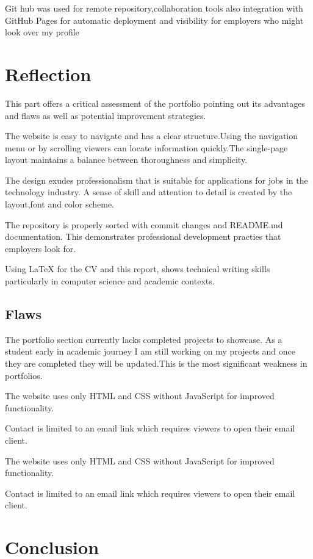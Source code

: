 \documentclass[12pt,a4paper]{article}
\begin{document}
Git hub was used for remote repository,collaboration tools also integration with GitHub Pages for automatic deployment and visibility for employers who might look over my profile 
\section{Reflection}

This part offers a critical assessment of the portfolio pointing out its advantages and flaws as well as potential improvement strategies.

The website is easy to navigate and has a clear structure.Using the navigation menu or by scrolling viewers can locate information quickly.The single-page layout maintains a balance between thoroughness and simplicity.

The design exudes professionalism that is suitable for applications for jobs in the technology industry. A sense of skill and attention to detail is created by the layout,font and color scheme.

The repository is properly sorted with commit changes and README.md documentation. This demonstrates professional development practies that employers look for.

Using LaTeX for the CV and this report, shows technical writing skills particularly in computer science and academic contexts.

\subsection{Flaws}

The portfolio section currently lacks completed projects to showcase. As a student early in academic journey I am still working on my projects and once they are completed they will be updated.This is the most significant weakness in portfolios.

The website uses only HTML and CSS without JavaScript for improved functionality.

Contact is limited to an email link which requires viewers to open their email client.


The website uses only HTML and CSS without JavaScript for improved functionality.

Contact is limited to an email link which requires viewers to open their email client.

\section{Conclusion}
\end{document}
